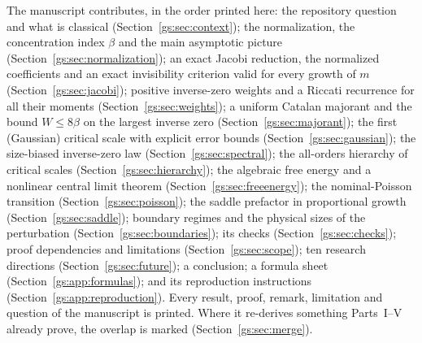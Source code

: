 \documentclass[11pt,a4paper]{article}
\numberwithin{equation}{section}
\theoremstyle{definition}
\theoremstyle{remark}
\begin{document}
The manuscript contributes, in the order printed here: the repository
question and what is classical (Section~\ref{gs:sec:context}); the
normalization, the concentration index $\beta$ and the main asymptotic
picture (Section~\ref{gs:sec:normalization}); an exact Jacobi reduction,
the normalized coefficients and an exact invisibility criterion valid for
every growth of $m$ (Section~\ref{gs:sec:jacobi}); positive inverse-zero
weights and a Riccati recurrence for all their moments
(Section~\ref{gs:sec:weights}); a uniform Catalan majorant and the bound
$W\le8\beta$ on the largest inverse zero (Section~\ref{gs:sec:majorant});
the first (Gaussian) critical scale with explicit error bounds
(Section~\ref{gs:sec:gaussian}); the size-biased inverse-zero law
(Section~\ref{gs:sec:spectral}); the all-orders hierarchy of critical
scales (Section~\ref{gs:sec:hierarchy}); the algebraic free energy and a
nonlinear central limit theorem (Section~\ref{gs:sec:freeenergy}); the
nominal-Poisson transition (Section~\ref{gs:sec:poisson}); the saddle
prefactor in proportional growth (Section~\ref{gs:sec:saddle}); boundary
regimes and the physical sizes of the perturbation
(Section~\ref{gs:sec:boundaries}); its checks
(Section~\ref{gs:sec:checks}); proof dependencies and limitations
(Section~\ref{gs:sec:scope}); ten research directions
(Section~\ref{gs:sec:future}); a conclusion; a formula sheet
(Section~\ref{gs:app:formulas}); and its reproduction instructions
(Section~\ref{gs:app:reproduction}).  Every result, proof, remark,
limitation and question of the manuscript is printed.  Where it re-derives
something Parts~I--V already prove, the overlap is marked
(Section~\ref{gs:sec:merge}).
\end{document}
